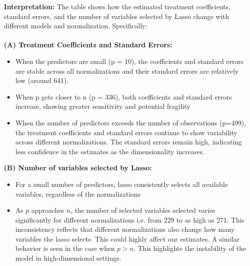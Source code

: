 \textbf{Interpretation:}
The table shows how the estimated treatment coefficients, standard errors, and the number of variables selected by Lasso change with different models and normalization. Specifically:\\
\\
\textbf{(A) Treatment Coefficients and Standard Errors:}
\begin{itemize}
    \item When the predictors are small (p = 10), the coefficients and standard errors are stable across all normalizations and their standard errors are relatively low (around 641).
    \item When p gets closer to n (p = 336), both coefficients and standard errors increase, showing greater sensitivity and potential fragility
    \item When the number of predictors exceeds the number of observations (p=499), the treatment coefficients and standard errors continue to show variability across different normalizations. The standard errors remain high, indicating less confidence in the estimates as the dimensionality increases. 

\end{itemize}

\textbf{(B) Number of variables selected by Lasso:}
\begin{itemize}
    \item For a small number of predictors, lasso consistently selects all available variables, regardless of the normalizations
    \item As $p$ approaches $n$, the number of selected variables selected varies significantly for different normalizations i.e. from 229 to as high as 271. This inconsistency reflects that different normalizations also change how many variables the lasso selects. This could highly affect our estimates. A similar behavior is seen in the case when $p>n$. This highlights the instability of the model in high-dimensional settings. 
\end{itemize}

